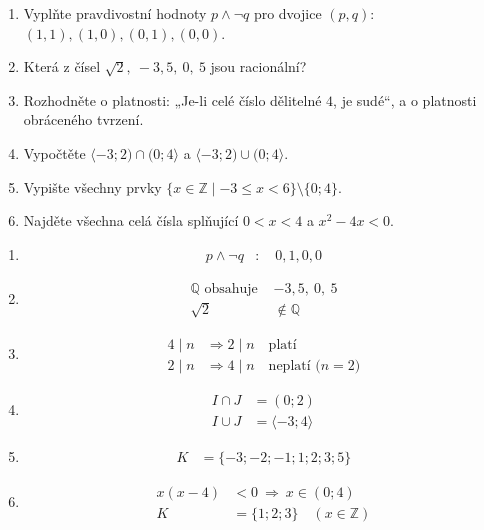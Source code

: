 \documentclass[11pt,a4paper]{article}
\begin{document}
\begin{zadaniReseniBox}[title={Domácí úkol}]
\begin{enumerate}[label=\alph*),itemsep=2pt]
\item Vyplňte pravdivostní hodnoty $p\wedge\neg q$ pro dvojice $(p,q)$: $(1,1),(1,0),(0,1),(0,0)$.
\item Která z čísel $\sqrt2,\ -3{,}5,\ 0,\ 5$ jsou racionální?
\item Rozhodněte o platnosti: „Je-li celé číslo dělitelné $4$, je sudé“, a o platnosti obráceného tvrzení.
\item Vypočtěte $\langle-3;2)\cap(0;4\rangle$ a $\langle-3;2)\cup(0;4\rangle$.
\item Vypište všechny prvky $\{x\in\mathbb Z\mid -3\le x<6\}\setminus\{0;4\}$.
\item Najděte všechna celá čísla splňující $0<x<4$ a $x^2-4x<0$.
\end{enumerate}
\tcblower
\begin{enumerate}[label=\alph*),itemsep=2pt]
\item
\[
\begin{aligned}
p\wedge\neg q&:\quad 0,1,0,0
\end{aligned}
\]
\item
\[
\begin{aligned}
\mathbb Q\text{ obsahuje }&-3{,}5,\ 0,\ 5\\
\sqrt2&\notin\mathbb Q
\end{aligned}
\]
\item
\[
\begin{aligned}
4\mid n&\Rightarrow 2\mid n\quad\text{platí}\\
2\mid n&\Rightarrow 4\mid n\quad\text{neplatí (}n=2\text{)}
\end{aligned}
\]
\item
\[
\begin{aligned}
I\cap J&=(0;2)\\
I\cup J&=\langle-3;4\rangle
\end{aligned}
\]
\item
\[
\begin{aligned}
K&=\{-3;-2;-1;1;2;3;5\}
\end{aligned}
\]
\item
\[
\begin{aligned}
x(x-4)&<0\ \Rightarrow\ x\in(0;4)\\
K&=\{1;2;3\}\quad(x\in\mathbb Z)
\end{aligned}
\]
\end{enumerate}
\end{zadaniReseniBox}
\end{document}
